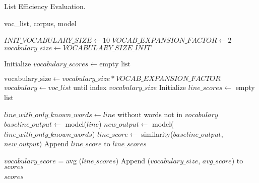 \begin{algorithm}
\caption{List Efficiency Evaluation.}
\label{alg:efficiency-evaluation}
\begin{algorithmic}[1]
\Require voc\_list, corpus, model

\State $INIT\_VOCABULARY\_SIZE \gets 10$ 
\State $VOCAB\_EXPANSION\_FACTOR \gets 2$ 
\State $vocabulary\_size \gets VOCABULARY\_SIZE\_INIT$ 

\State Initialize $vocabulary\_scores \gets \text{empty list}$

    \State $\text{vocabulary\_size} \gets vocabulary\_size * VOCAB\_EXPANSION\_FACTOR$ 
    \State $vocabulary \gets voc\_list$ until index $vocabulary\_size$
    \State Initialize $line\_scores \gets$ empty list
    
        \State $line\_with\_only\_known\_words \gets line $ without words not in $vocabulary$
        \State $baseline\_output \gets$ model($line$)
        \State $new\_output \gets$ model($line\_with\_only\_known\_words$)
        \State $line\_score \gets$ similarity($baseline\_output $, $new\_output$)
        \State Append $line\_score$ to $line\_scores$
    \EndFor

    \State $vocabulary\_score$ = avg ($line\_scores$)
    \State Append ($vocabulary\_size$, $avg\_score$) to $scores$
\EndWhile

\State \Return $scores$

\end{algorithmic}
\end{algorithm}
